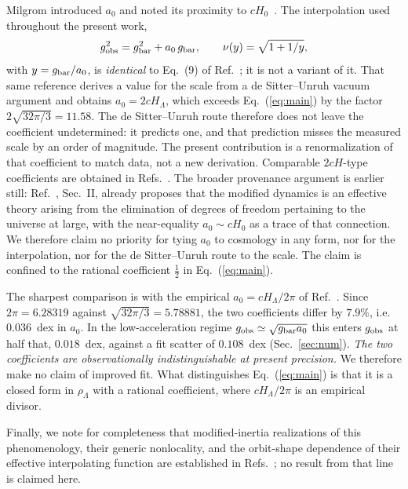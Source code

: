 \documentclass[aps,prd,reprint,amsmath,amssymb,nofootinbib,superscriptaddress]{revtex4-2}
\begin{document}
Milgrom introduced $a_0$ and noted its proximity to $cH_0$~\cite{Milgrom1983}. The interpolation used
throughout the present work,
\begin{equation}
g_{\rm obs}^2 = g_{\rm bar}^2 + a_0\,g_{\rm bar},
\qquad
\nu(y) = \sqrt{1+1/y},
\label{eq:closure}
\end{equation}
with $y = g_{\rm bar}/a_0$, is \emph{identical} to Eq.~(9) of Ref.~\cite{Milgrom1999}; it is not a
variant of it. That same reference derives a value for the scale from a de Sitter--Unruh vacuum
argument and obtains $a_0 = 2cH_\Lambda$, which exceeds Eq.~(\ref{eq:main}) by the factor
$2\sqrt{32\pi/3} = 11.58$. The de Sitter--Unruh route therefore does not leave the coefficient
undetermined: it predicts one, and that prediction misses the measured scale by an order of magnitude.
The present contribution is a renormalization of that coefficient to match data, not a new derivation.
Comparable $2cH$-type coefficients are obtained in Refs.~\cite{Pikhitsa2010,Klinkhamer2011}.
The broader provenance argument is earlier still: Ref.~\cite{Milgrom1994}, Sec.~II, already proposes that
the modified dynamics is an effective theory arising from the elimination of degrees of freedom pertaining
to the universe at large, with the near-equality $a_0\sim cH_0$ as a trace of that connection. We therefore
claim no priority for tying $a_0$ to cosmology in any form, nor for the interpolation, nor for the de
Sitter--Unruh route to the scale. The claim is confined to the rational coefficient $\tfrac12$ in
Eq.~(\ref{eq:main}).

The sharpest comparison is with the empirical $a_0 = cH_\Lambda/2\pi$ of Ref.~\cite{Milgrom2020}. Since
$2\pi = 6.28319$ against $\sqrt{32\pi/3} = 5.78881$, the two coefficients differ by $7.9\%$, i.e.\
$0.036$~dex in $a_0$. In the low-acceleration regime $g_{\rm obs}\simeq\sqrt{g_{\rm bar}a_0}$ this
enters $g_{\rm obs}$ at half that, $0.018$~dex, against a fit scatter of $0.108$~dex
(Sec.~\ref{sec:num}). \emph{The two coefficients are observationally indistinguishable at present
precision.} We therefore make no claim of improved fit. What distinguishes Eq.~(\ref{eq:main}) is that
it is a closed form in $\rho_\Lambda$ with a rational coefficient, where $cH_\Lambda/2\pi$ is an
empirical divisor.

Finally, we note for completeness that modified-inertia realizations of this phenomenology, their
generic nonlocality, and the orbit-shape dependence of their effective interpolating function are
established in Refs.~\cite{Milgrom1994,Milgrom2022}; no result from that line is claimed here.
\end{document}
